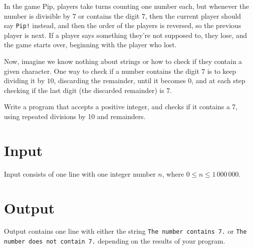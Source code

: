 
In the game Pip,
players take turns counting one number each,
but whenever the number is divisible by $7$
or contains the digit $7$,
then the current player should say \texttt{Pip!} instead,
and then the order of the players is reversed,
so the previous player is next.
If a player says something they're not supposed to,
they lose,
and the game starts over,
beginning with the player who lost.

Now, imagine we know nothing about strings or how to check if they contain a given character.
One way to check if a number contains the digit $7$
is to keep dividing it by $10$, discarding the remainder, until it becomes $0$,
and at each step checking if the last digit (the discarded remainder) is $7$.

Write a program that accepts a positive integer,
and checks if it contains a 7,
using repeated divisions by 10 and remainders.

\section*{Input}

Input consists of one line with one integer number $n$, where $0 \leq n \leq 1\,000\,000$.

\section*{Output}
Output contains one line with either the string \texttt{The number contains 7.} or \texttt{The number does not contain 7.} depending on the results of your program.
